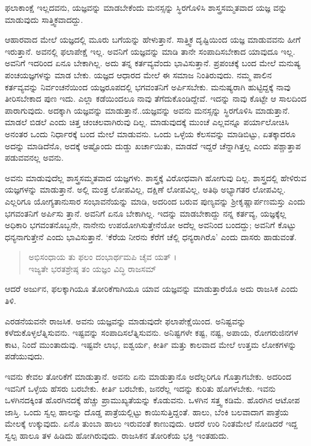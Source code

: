 {\small ಫಲಾಕಾಂಕ್ಷೆ ಇಲ್ಲದವನು, ಯಜ್ಞವನ್ನು ಮಾಡಬೇಕೆಂದು ಮನಸ್ಸನ್ನು ಸ್ಥಿರಗೊಳಿಸಿ ಶಾಸ್ತ್ರಸಮ್ಮತವಾದ ಯಜ್ಞ ವನ್ನು ಮಾಡುವುದು ಸಾತ್ತ್ವಿಕವಾದದ್ದು.}

ಆಹಾರವಾದ ಮೇಲೆ ಯಜ್ಞದಲ್ಲಿ ಮೂರು ಬಗೆಯನ್ನು ಹೇಳುತ್ತಾನೆ. ಸಾತ್ತ್ವಿಕ ದೃಷ್ಟಿಯಿಂದ ಯಜ್ಞ ಮಾಡುವವನು ಹೀಗೆ ಇರುತ್ತಾನೆ. ಅವನಲ್ಲಿ ಫಲಾಪೇಕ್ಷೆ ಇಲ್ಲ. ಅವನಿಗೆ ಯಜ್ಞವನ್ನು ಮಾಡಿ ತಾನೇ ಸಂಪಾದಿಸಬೇಕಾದ ಯಾವುದೂ ಇಲ್ಲ. ಅವನಿಗೆ ಇದರಿಂದ ಏನೂ ಬೇಕಾಗಿಲ್ಲ. ಅದು ತನ್ನ ಕರ್ತವ್ಯವೆಂದು ಭಾವಿಸುತ್ತಾನೆ. ಪ್ರಪಂಚಕ್ಕೆ ಬಂದ ಮೇಲೆ ಮನುಷ್ಯ ಪಂಚಯಜ್ಞಗಳನ್ನು ಮಾಡ ಬೇಕು. ಯಜ್ಞದ ಆಧಾರದ ಮೇಲೆ ಈ ಸಮಾಜ ನಿಂತಿರುವುದು. ನಮ್ಮ ಪಾಲಿನ ಕರ್ತವ್ಯವನ್ನು ನಿರ್ವಂಚನೆಯಿಂದ ಯಜ್ಞರೂಪದಲ್ಲಿ ಭಗವಂತನಿಗೆ ಅರ್ಪಿಸಬೇಕು. ಮನುಷ್ಯರಾಗಿ ಹುಟ್ಟಿದ್ದಕ್ಕೆ ನಾವು ತೀರಿಸಬೇಕಾದ ಪುಣ ಇದು. ಎಲ್ಲಾ ಕಡೆಯಿಂದಲೂ ನಾವು ತೆಗೆದುಕೊಂಡಿದ್ದೇವೆ. ಇದನ್ನು ನಾವು ಕೊಟ್ಟೇ ಆ ಸಾಲದಿಂದ ಪಾರಾಗುವುದು. ಅದಕ್ಕಾಗಿ ಯಜ್ಞವನ್ನು ಮಾಡುತ್ತಾನೆ..ಯಜ್ಞವನ್ನು ಅವನು ಮನಸ್ಸನ್ನು ಸ್ಥಿರಗೊಳಿಸಿ ಮಾಡುತ್ತಾನೆ. ಮಾಡಲೆ ಬಿಡಲೆ ಎಂದು ಚಿತ್ತ ಚಂಚಲವಾಗಿರುವು ದಿಲ್ಲ. ಮಾಡುವುದಕ್ಕೆ ಮುಂಚೆ ಎಲ್ಲವನ್ನೂ ಪರ್ಯಾಲೋಚಿಸಿ ಅನಂತರ ಒಂದು ನಿರ್ಧಾರಕ್ಕೆ ಬಂದ ಮೇಲೆ ಮಾಡುವನು. ಒಂದು ಒಳ್ಳೆಯ ಕೆಲಸವನ್ನು ಮಾಡಿಬಿಟ್ಟು, ಏತಕ್ಕಾದರೂ ಅದನ್ನು ಮಾಡಿದೆನೊ, ಅದಕ್ಕೆ ಅಷ್ಟೊಂದು ದುಡ್ಡು ಖರ್ಚಾಯಿತು, ಮಾಡದೆ ಇದ್ದರೆ ಚೆನ್ನಾಗಿತ್ತಲ್ಲ ಎಂದು ಪಶ್ಚಾತ್ತಾಪ ಪಡುವವನಲ್ಲ ಅವನು.

ಅವನು ಮಾಡುವುದೆಲ್ಲ ಶಾಸ್ತ್ರಸಮ್ಮತವಾದ ಯಜ್ಞಗಳು. ಶಾಸ್ತ್ರಕ್ಕೆ ವಿರೋಧವಾಗಿ ಹೋಗುವು ದಿಲ್ಲ. ಶಾಸ್ತ್ರದಲ್ಲಿ ಹೇಳಿರುವ ಯಜ್ಞಗಳನ್ನು ಮಾಡುತ್ತಾನೆ. ಅಲ್ಲಿ ಮಂತ್ರ ಲೋಪವಿಲ್ಲ, ದಕ್ಷಿಣೆ ಲೋಪವಿಲ್ಲ, ಅತಿಥಿ ಅಭ್ಯಾಗತರ ಲೋಪವಿಲ್ಲ. ಎಲ್ಲರಿಗೂ ಯೋಗ್ಯತಾನುಸಾರ ಸಂಭಾವನೆಯನ್ನು ಮಾಡಿ, ಅದರಿಂದ ಬರುವ ಪುಣ್ಯವನ್ನು ಶ್ರೀಕೃಷ್ಣಾರ್ಪಣಮಸ್ತು ಎಂದು ಭಗವಂತನಿಗೆ ಅರ್ಪಿಸು ತ್ತಾನೆ. ಅವನಿಗೆ ಏನೂ ಬೇಕಾಗಿಲ್ಲ. ಇದನ್ನು ಮಾಡಬೇಕಾದ್ದು ನನ್ನ ಕರ್ತವ್ಯ, ಯಜ್ಞಕ್ಕೆಲ್ಲ ಅಧಿಕಾರಿ ಭಗವಂತನೊಬ್ಬನೇ, ನಾನೇನು ಉಪಯೋಗಿಸುತ್ತೇನೆಯೋ ಅದೆಲ್ಲ ಅವನಿಂದ ಬಂದದ್ದು; ಅವನಿಗೆ ಕೊಟ್ಟು ಧನ್ಯನಾಗುತ್ತೇನೆ ಎಂದು ಭಾವಿಸುತ್ತಾನೆ. ‘ಕೆರೆಯ ನೀರನು ಕೆರೆಗೆ ಚೆಲ್ಲಿ ಧನ್ಯರಾಗಿರೊ’ ಎಂದು ದಾಸರು ಹಾಡುವಂತೆ.

\begin{verse}
ಅಭಿಸಂಧಾಯ ತು ಫಲಂ ದಂಭಾರ್ಥಮಪಿ ಚೈವ ಯತ್ ।\\ಇಜ್ಯತೇ ಭರತಶ್ರೇಷ್ಠ ತಂ ಯಜ್ಞಂ ವಿದ್ಧಿ ರಾಜಸಮ್ 
\end{verse}

{\small ಆದರೆ ಅರ್ಜುನ, ಫಲಕ್ಕಾಗಿಯೂ ತೋರಿಕೆಗಾಗಿಯೂ ಯಾವ ಯಜ್ಞವನ್ನು ಮಾಡುತ್ತಾರೆಯೊ ಅದು ರಾಜಸಿಕ ಎಂದು ತಿಳಿ.}

ಎರಡನೆಯವನೇ ರಾಜಸಿಕ. ಅವನು ಯಜ್ಞವನ್ನು ಮಾಡುವುದೇ ಫಲಾಪೇಕ್ಷೆಯಿಂದ. ಅನಿಷ್ಟವನ್ನು ಕಳೆದುಕೊಳ್ಳಲೆತ್ನಿಸುವನು. ಇಷ್ಟವನ್ನು ಸಂಪಾದಿಸಲೆತ್ನಿಸುವನು. ಅನಿಷ್ಟಗಳೇ ಕಷ್ಟ, ನಷ್ಟ, ಅಪಾಯ, ರೋಗರುಜಿನಗಳ ಕಾಟ, ನಿಂದೆ ಮುಂತಾದುವು. ಇಷ್ಟವೇ ಲಾಭ, ಐಶ್ವರ್ಯ, ಕೀರ್ತಿ ಮತ್ತು ಕಾಲವಾದ ಮೇಲೆ ಉತ್ತಮ ಲೋಕಗಳನ್ನು ಪಡೆಯುವುದು.

ಇವನು ಕೇವಲ ತೋರಿಕೆಗೆ ಮಾಡುತ್ತಾನೆ. ಅವನು ಏನು ಮಾಡುತ್ತಾನೊ ಅದೆಲ್ಲರಿಗೂ ಗೊತ್ತಾಗಬೇಕು. ಅದರಿಂದ ಇವನಿಗೆ ಒಳ್ಳೆಯ ಹೆಸರು ಬರಬೇಕು. ಕೀರ್ತಿ ಬರಬೇಕು, ಜನರೆಲ್ಲ ಇದನ್ನು ಕುರಿತು ಹೊಗಳಬೇಕು. ಇವನು ಒಳಗಿನದಕ್ಕಿಂತ ಹೊರಗಿನದಕ್ಕೆ ಹೆಚ್ಚು ಪ್ರಾಮುಖ್ಯತೆಯನ್ನು ಕೊಡುವನು. ಒಳಗಿನ ಸತ್ತ್ವ ಕಡಿಮೆ. ಹೊರಗಿನ ಆಟೋಪ ಜಾಸ್ತಿ. ಒಂದು ಸ್ವಲ್ಪ ಹಾಲನ್ನು ದೊಡ್ಡ ಪಾತ್ರೆಯಲ್ಲಿಟ್ಟು ಕಾಯಿಸುತ್ತಿದ್ದಂತೆ. ಹಾಲು, ಬೆಂಕಿ ಬಲವಾದಾಗ ಪಾತ್ರೆಯ ಮೇಲಕ್ಕೆ ಉಕ್ಕುವುದು. ಏನೊ ತುಂಬಾ ಹಾಲು ಇರುವಂತೆ ಕಾಣುವುದು. ಆದರೆ ಉರಿ ನಿಂತಮೇಲೆ ನೋಡಿದರೆ ಇದ್ದ ಸ್ವಲ್ಪ ಹಾಲೂ ತಳ ಹಿಡಿದು ಹೋಗಿರುವುದು. ರಾಜಸಿಕನ ತೋರಿಕೆಯ ಭಕ್ತಿ ಇಂತಹುದು.

